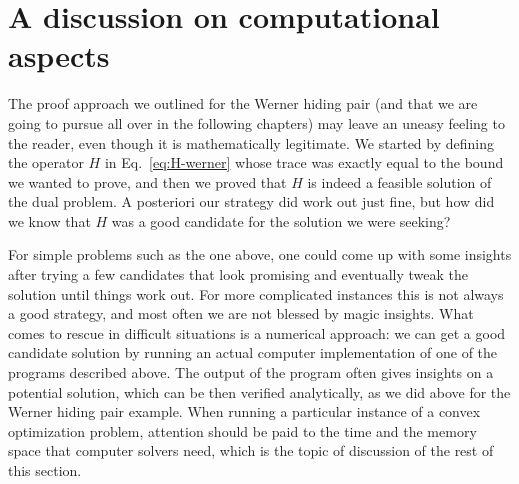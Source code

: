 \section{A discussion on computational aspects}
\label{sec:computational-aspects}

The proof approach we outlined for the Werner hiding pair (and that we are going to 
pursue all over in the following chapters) may leave an uneasy feeling to the reader, 
even though it is mathematically legitimate. We started by defining the operator $H$ in 
Eq.~\eqref{eq:H-werner} whose trace was exactly equal to the bound we wanted to prove, 
and then we proved that $H$ is indeed a feasible solution of the dual problem.
A posteriori our strategy did work out just fine, but how did we know that $H$ was 
a good candidate for the solution we were seeking?

For simple problems such as the one above, one could come up with some
insights after trying a few candidates that look promising and eventually tweak
the solution until things work out.
For more complicated instances this is not always a good strategy, and most often we are not 
blessed by magic insights. What comes to rescue in difficult situations is a numerical 
approach: we can get a good candidate solution by running an actual computer implementation of 
one of the programs described above. 
The output of the program often gives insights on a potential solution, which can 
be then verified analytically, as we did above for the Werner hiding pair example. 
When running a particular instance of a convex optimization problem, 
attention should be paid to the time and the memory space that computer solvers need,
which is the topic of discussion of the rest of this section.

